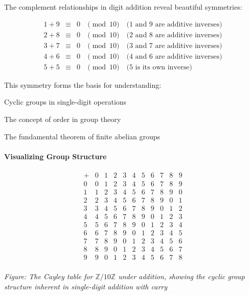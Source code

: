 The complement relationships in digit addition reveal beautiful symmetries:

$$
\begin{array}{rcll}
1 + 9 &\equiv& 0 &\pmod{10} \quad \text{($1$ and $9$ are additive inverses)} \\
2 + 8 &\equiv& 0 &\pmod{10} \quad \text{($2$ and $8$ are additive inverses)} \\
3 + 7 &\equiv& 0 &\pmod{10} \quad \text{($3$ and $7$ are additive inverses)} \\
4 + 6 &\equiv& 0 &\pmod{10} \quad \text{($4$ and $6$ are additive inverses)} \\
5 + 5 &\equiv& 0 &\pmod{10} \quad \text{($5$ is its own inverse)}
\end{array}
$$

This symmetry forms the basis for understanding:

\noindent Cyclic groups in single-digit operations


\noindent The concept of order in group theory


\noindent The fundamental theorem of finite abelian groups

\paragraph{Visualizing Group Structure}

$$
\begin{array}{c|cccccccccc}
+ & 0 & 1 & 2 & 3 & 4 & 5 & 6 & 7 & 8 & 9 \\
\hline
0 & 0 & 1 & 2 & 3 & 4 & 5 & 6 & 7 & 8 & 9 \\
1 & 1 & 2 & 3 & 4 & 5 & 6 & 7 & 8 & 9 & 0 \\
2 & 2 & 3 & 4 & 5 & 6 & 7 & 8 & 9 & 0 & 1 \\
3 & 3 & 4 & 5 & 6 & 7 & 8 & 9 & 0 & 1 & 2 \\
4 & 4 & 5 & 6 & 7 & 8 & 9 & 0 & 1 & 2 & 3 \\
5 & 5 & 6 & 7 & 8 & 9 & 0 & 1 & 2 & 3 & 4 \\
6 & 6 & 7 & 8 & 9 & 0 & 1 & 2 & 3 & 4 & 5 \\
7 & 7 & 8 & 9 & 0 & 1 & 2 & 3 & 4 & 5 & 6 \\
8 & 8 & 9 & 0 & 1 & 2 & 3 & 4 & 5 & 6 & 7 \\
9 & 9 & 0 & 1 & 2 & 3 & 4 & 5 & 6 & 7 & 8 \\
\end{array}
$$

\emph{Figure: The Cayley table for $\mathbb{Z}/10\mathbb{Z}$ under addition, showing the cyclic group structure inherent in single-digit addition with carry}
